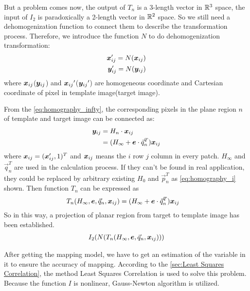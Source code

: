 But a problem comes now, the output of $T_n$ is a 3-length vector in $\mathbb{R}^3$ space, the input of $I_2$ is paradoxically a 2-length vector in $\mathbb{R}^2$ space. So we still need a dehomogenization function to connect them to describe the transformation process. Therefore, we introduce the function $N$ to do dehomogenization transformation:
\begin{align} \label{eq:N}
	\boldsymbol{x}'_{ij} = N(\boldsymbol{x}_{ij}) \\
	\boldsymbol{y}'_{ij} = N(\boldsymbol{y}_{ij})
\end{align}
where $\boldsymbol{x}_{ij}$($\boldsymbol{y}_{ij}$) and ${\boldsymbol{x}_{ij}}'$(${\boldsymbol{y}_{ij}}'$)  are homogeneous coordinate and Cartesian coordinate of pixel in template image(target image).

From the \cref{eq:homography_infty}, the corresponding pixels in the plane region $n$ of template and target image can be connected as:
\begin{align}
	\boldsymbol{y}_{ij} & = H_n \cdot \boldsymbol{x}_{ij} \nonumber \\
			& = (H_{\infty} + \boldsymbol{e} \cdot \vec{q}_{n}^T) \boldsymbol{x}_{ij}
\end{align}	
where $\boldsymbol{x}_{ij} = (\boldsymbol{x}'_{ij}, 1)^T$ and $\boldsymbol{x}_{ij}$ means the $i$ row $j$ column in every patch. $H_\infty$ and $\vec{q}_{n}^T$ are used in the calculation process. If they can't be found in real application, they could be replaced by arbitrary existing $H_0$ and $\vec{p}^T_n$ as \cref{eq:homography_i} shown. Then function $T_n$ can be expressed as 
\begin{align}
	T_n(H_{\infty}, \boldsymbol{e}, \vec{q}_n, \boldsymbol{x}_{ij}) & = (H_{\infty} + \boldsymbol{e} \cdot \vec{q}_{n}^T) \boldsymbol{x}_{ij}
\end{align}
So in this way, a projection of planar region from target to template image has been established. 
\begin{align}\label{eq:I_2}
I_2(N(T_n(H_{\infty}, \boldsymbol{e}, \vec{q}_n, \boldsymbol{x}_{ij})))
\end{align}

After getting the mapping model, we have to get an estimation of the variable in it to ensure the accuracy of mapping. According to the \cref{sec:Least Squares Correlation}, the method Least Squares Correlation is used to solve this problem. Because the function $I$ is nonlinear, Gauss-Newton algorithm is utilized. 

